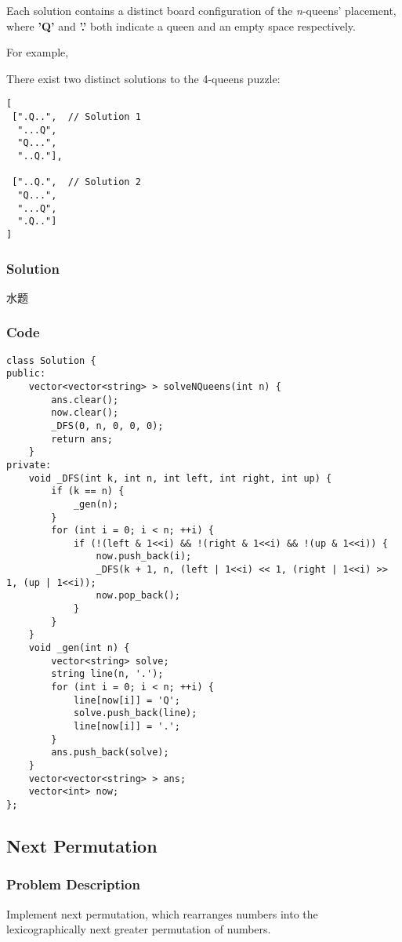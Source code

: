 \documentclass[courier]{article}
\begin{document}
\begin{CJK*}{UTF8}{gkai}
Each solution contains a distinct board configuration of the \emph{n}-queens' placement, where \textbf{'Q'} and \textbf{'.'} both indicate a queen and an empty space respectively.

For example,


There exist two distinct solutions to the 4-queens puzzle:

\begin{verbatim}
[
 [".Q..",  // Solution 1
  "...Q",
  "Q...",
  "..Q."],

 ["..Q.",  // Solution 2
  "Q...",
  "...Q",
  ".Q.."]
]
\end{verbatim}


\subsubsection*{Solution}
水题

\subsubsection*{Code}
\begin{lstlisting}
class Solution {
public:
    vector<vector<string> > solveNQueens(int n) {
        ans.clear();
        now.clear();
        _DFS(0, n, 0, 0, 0);
        return ans;
    }
private:
    void _DFS(int k, int n, int left, int right, int up) {
        if (k == n) {
            _gen(n);
        }
        for (int i = 0; i < n; ++i) {
            if (!(left & 1<<i) && !(right & 1<<i) && !(up & 1<<i)) {
                now.push_back(i);
                _DFS(k + 1, n, (left | 1<<i) << 1, (right | 1<<i) >> 1, (up | 1<<i));
                now.pop_back();
            }
        }
    }
    void _gen(int n) {
        vector<string> solve;
        string line(n, '.');
        for (int i = 0; i < n; ++i) {
            line[now[i]] = 'Q';
            solve.push_back(line);
            line[now[i]] = '.';
        }
        ans.push_back(solve);
    }
    vector<vector<string> > ans;
    vector<int> now;
}; 
\end{lstlisting}


\subsection{ Next Permutation }

\subsubsection*{Problem Description}
Implement next permutation, which rearranges numbers into the lexicographically next greater permutation of numbers.


\end{CJK*}
\end{document}
